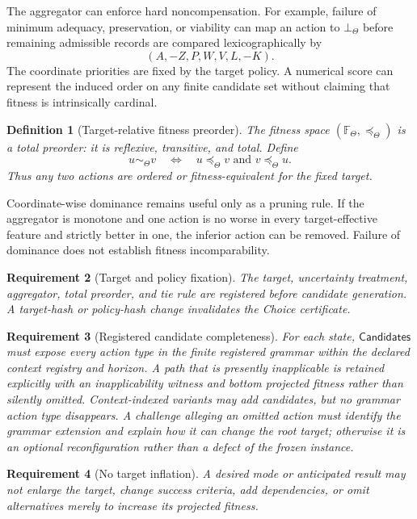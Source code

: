 \documentclass[10pt]{article}
\newtheorem{definition}{Definition}[section]
\newtheorem{requirement}[definition]{Requirement}
\newcommand{\Candidates}{\mathsf{Candidates}}
\newcommand{\Target}{\Theta}
\begin{document}
The aggregator can enforce hard noncompensation.  For example, failure of minimum adequacy, preservation, or viability can map an action to $\bot_\Target$ before remaining admissible records are compared lexicographically by
\[
  (A,-Z,P,W,V,L,-K).
\]
The coordinate priorities are fixed by the target policy.  A numerical score can represent the induced order on any finite candidate set without claiming that fitness is intrinsically cardinal.

\begin{definition}[Target-relative fitness preorder]
The fitness space $(\mathbb F_\Target,\preceq_\Target)$ is a total preorder: it is reflexive, transitive, and total.  Define
\[
  u\sim_\Target v
  \quad\Longleftrightarrow\quad
  u\preceq_\Target v\text{ and }v\preceq_\Target u.
\]
Thus any two actions are ordered or fitness-equivalent for the fixed target.
\end{definition}

Coordinate-wise dominance remains useful only as a pruning rule.  If the aggregator is monotone and one action is no worse in every target-effective feature and strictly better in one, the inferior action can be removed.  Failure of dominance does not establish fitness incomparability.

\begin{requirement}[Target and policy fixation]\label{req:same-target}
The target, uncertainty treatment, aggregator, total preorder, and tie rule are registered before candidate generation.  A target-hash or policy-hash change invalidates the Choice certificate.
\end{requirement}


\begin{requirement}[Registered candidate completeness]\label{req:candidate-complete}
For each state, $\Candidates$ must expose every action type in the finite registered grammar within the declared context registry and horizon.  A path that is presently inapplicable is retained explicitly with an inapplicability witness and bottom projected fitness rather than silently omitted.  Context-indexed variants may add candidates, but no grammar action type disappears.  A challenge alleging an omitted action must identify the grammar extension and explain how it can change the root target; otherwise it is an optional reconfiguration rather than a defect of the frozen instance.
\end{requirement}

\begin{requirement}[No target inflation]\label{req:no-inflation}
A desired mode or anticipated result may not enlarge the target, change success criteria, add dependencies, or omit alternatives merely to increase its projected fitness.
\end{requirement}
\end{document}
